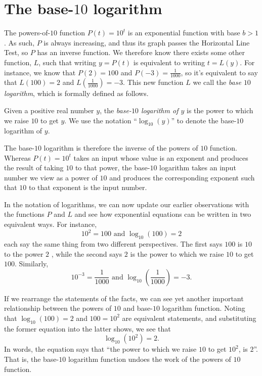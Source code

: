 \documentclass[nooutcomes]{ximera}
\begin{document}
\section{The base-\(10\) logarithm}

The powers-of-\(10\) function \(P(t) = 10^t\) is an exponential function with base \(b \gt 1\).  As such, \(P\) is always increasing, and thus its graph passes the Horizontal Line Test, so \(P\) has an inverse function.  We therefore know there exists some other function, \(L\), such that writing \(y = P(t)\) is equivalent to writing \(t = L(y)\).  For instance, we know that \(P(2)=100\) and \(P(-3)=\frac{1}{1000}\), so it's equivalent to say that \(L(100) = 2\) and \(L(\frac{1}{1000}) = -3\).  This new function \(L\) we call the \emph{base \(10\) logarithm}, which is formally defined as follows.%

Given a positive real number \(y\), the \emph{base-\(10\) logarithm of \(y\)} is the power to which we raise \(10\) to get \(y\).  We use the notation ``\(\log_{10}(y)\)'' to denote the base-\(10\) logarithm of \(y\).%

The base-\(10\) logarithm is therefore the inverse of the powers of \(10\) function.  Whereas \(P(t) = 10^t\) takes an input whose value is an exponent and produces the result of taking \(10\) to that power, the base-\(10\) logarithm takes an input number we view as a power of \(10\) and produces the corresponding exponent such that \(10\) to that exponent is the input number.%

In the notation of logarithms, we can now update our earlier observations with the functions \(P\) and \(L\) and see how exponential equations can be written in two equivalent ways.  For instance,%
\begin{equation}
10^2 = 100 \text{ and } \log_{10}(100) = 2\label{eq-exp-log-base-10-2}
\end{equation}
each say the same thing from two different perspectives.  The first says \(100\) is \(10\) to the power \(2\) , while the second says \(2\) is the power to which we raise \(10\) to get \(100\).  Similarly,%
\begin{equation}
10^{-3} = \frac{1}{1000} \text{ and } \log_{10} \left( \frac{1}{1000} \right) = -3\text{.}\label{eq-exp-log-base-10-minus-3}
\end{equation}

If we rearrange the statements of the facts, we can see yet another important relationship between the powers of \(10\) and base-\(10\) logarithm function.  Noting that \(\log_{10}(100) = 2\) and \(100 = 10^2\) are equivalent statements, and substituting the former equation into the latter shows, we see that%
\begin{equation}
\log_{10}(10^2) = 2\text{.}
\end{equation}
In words, the equation says that ``the power to which we raise \(10\) to get \(10^2\), is \(2\)''.  That is, the base-\(10\) logarithm function undoes the work of the powers of \(10\) function.%
\end{document}
